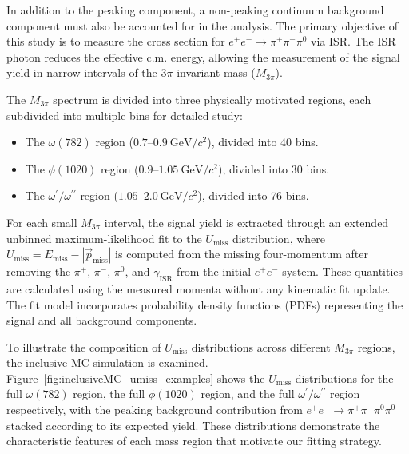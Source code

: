 In addition to the peaking component, a non-peaking continuum background
component must also be accounted for in the analysis. The primary objective of
this study is to measure the cross section for $e^{+}e^{-} \to
    \pi^{+}\pi^{-}\pi^{0}$ via ISR. The ISR photon reduces the effective c.m.
energy, allowing the measurement of the signal yield in narrow intervals of the
$3\pi$ invariant mass ($M_{3\pi}$).

The $M_{3\pi}$ spectrum is divided into three physically motivated regions,
each subdivided into multiple bins for detailed study:
\begin{itemize}
    \item The $\omega(782)$ region ($0.7$–$0.9~\text{GeV}/c^{2}$), divided into 40 bins.
    \item The $\phi(1020)$ region ($0.9$–$1.05~\text{GeV}/c^{2}$), divided into 30 bins.
    \item The $\omega^{\prime}/\omega^{\prime\prime}$ region
          ($1.05$–$2.0~\text{GeV}/c^{2}$), divided into 76 bins.
\end{itemize}

For each small $M_{3\pi}$ interval, the signal yield is extracted through an extended unbinned maximum-likelihood fit to the $U_{\text{miss}}$ distribution, where $U_{\text{miss}} = E_{\text{miss}} - |\vec{p}_{\text{miss}}|$ is computed from the missing four-momentum after removing the $\pi^+$, $\pi^-$, $\pi^0$, and $\gamma_{\text{ISR}}$ from the initial $e^+e^-$ system. These quantities are calculated using the measured momenta without any kinematic fit update. The fit model incorporates probability density functions (PDFs) representing the signal and all background components.

To illustrate the composition of $U_{\text{miss}}$ distributions across
different $M_{3\pi}$ regions, the inclusive MC simulation is examined.
Figure~\ref{fig:inclusiveMC_umiss_examples} shows the $U_{\text{miss}}$
distributions for the full $\omega(782)$ region, the full $\phi(1020)$ region,
and the full $\omega^{\prime}/\omega^{\prime\prime}$ region respectively, with
the peaking background contribution from $e^{+}e^{-} \to
    \pi^{+}\pi^{-}\pi^{0}\pi^{0}$ stacked according to its expected yield. These
distributions demonstrate the characteristic features of each mass region that
motivate our fitting strategy.

